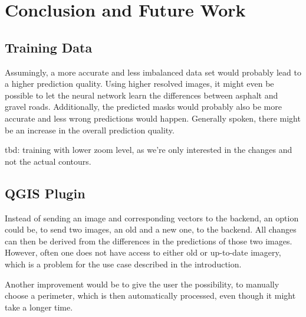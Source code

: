 
\chapter{Conclusion and Future Work}\label{chp:conclusion_and_future_work}

\section{Training Data}
Assumingly, a more accurate and less imbalanced data set would probably lead to a higher prediction quality. Using higher resolved images, it might even be possible to let the neural network learn the differences between asphalt and gravel roads. Additionally, the predicted masks would probably also be more accurate and less wrong predictions would happen. Generally spoken, there might be an increase in the overall prediction quality.

tbd: training with lower zoom level, as we're only interested in the changes and not the actual contours.

\section{QGIS Plugin}
Instead of sending an image and corresponding vectors to the backend, an option could be, to send two images, an old and a new one, to the backend. All changes can then be derived from the differences in the predictions of those two images. However, often one does not have access to either old or up-to-date imagery,
which is a problem for the use case described in the introduction.

Another improvement would be to give the user the possibility, to manually choose a perimeter, which is then automatically processed, even though it might take a longer time.